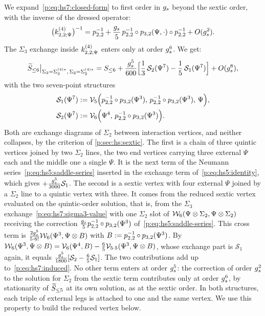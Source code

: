 We expand~\eqref{p:eq:hs7:closed-form} to first order in $\gs$ beyond the sextic order, with the inverse of the dressed operator:
\begin{equation}
\big( \kin{2}{\Psi}{4} \big)^{-1}
  = \sprod{2}{2}^{-1}
    + \frac{\gs}{5} \, \sprod{2}{2}^{-1} \circ \sprod{3}{2}(\Psi, \cdot) \circ \sprod{2}{2}^{-1}
    + O(\gs^2).
\end{equation}
The $\Sigma_3$ exchange inside $\kin{2}{\Psi}{4}$ enters only at order $\gs^6$.
We get:
\begin{equation}
  \label{p:eq:hs7:induced}
  \caction[\le 6] \big|_{\Sigma_3 = \Sigma_3^{(4)*}, \, \Sigma_2 = \Sigma_2^{(4)*}}
    = S_{\le 6}
      + \frac{\gs^5}{600} \Big[ \frac{1}{3} \, \mathcal S_2(\Psi^7) - \frac{1}{5} \, \mathcal S_1(\Psi^7) \Big]
      + O(\gs^6),
\end{equation}
with the two seven-point structures
\begin{subequations}
  \label{p:eq:hs7:structures}
  \begin{align}
    \label{p:eq:hs7:S1}
    \mathcal S_1(\Psi^7)
      &
      := \vertex{5}\Big( \sprod{2}{2}^{-1} \circ \sprod{3}{2}(\Psi^3), \, \sprod{2}{2}^{-1} \circ \sprod{3}{2}(\Psi^3), \, \Psi \Big),
    \\
    \label{p:eq:hs7:S2}
    \mathcal S_2(\Psi^7)
      &
      := \vertex{6}\Big( \Psi^4, \, \sprod{2}{2}^{-1} \circ \sprod{3}{2}(\Psi^3) \Big).
  \end{align}
\end{subequations}
Both are exchange diagrams of $\Sigma_2$ between interaction vertices, and neither collapses, by the criterion of \cref{p:sec:hs:sextic}.
The first is a chain of three quintic vertices joined by two $\Sigma_2$ lines, the two end vertices carrying three external $\Psi$ each and the middle one a single $\Psi$.
It is the next term of the Neumann series~\eqref{p:eq:hs5:saddle-series} inserted in the exchange term of~\eqref{p:eq:hs5:identity}, which gives $+ \tfrac{\gs^5}{3000} \mathcal S_1$.
The second is a sextic vertex with four external $\Psi$ joined by a $\Sigma_2$ line to a quintic vertex with three.
It comes from the reduced sextic vertex evaluated on the quintic-order solution, that is, from the $\Sigma_3$ exchange~\eqref{p:eq:hs7:sigma3-value} with one $\Sigma_2$ slot of $\dvertex{6}(\Psi \otimes \Sigma_2, \Psi \otimes \Sigma_2)$ receiving the correction $\tfrac{\gs}{5} \sprod{2}{2}^{-1} \circ \sprod{3}{2}(\Psi^3)$ of~\eqref{p:eq:hs5:saddle-series}.
This cross term is $\tfrac{2 \gs^5}{5 \cdot 6!} \dvertex{6}(\Psi^3, \Psi \otimes B)$ with $B := \sprod{2}{2}^{-1} \circ \sprod{3}{2}(\Psi^3)$.
By $\dvertex{6}(\Psi^3, \Psi \otimes B) = \vertex{6}(\Psi^4, B) - \tfrac{6}{5} \vertex{5 \cdot 5}(\Psi^3, \Psi \otimes B)$, whose exchange part is $\mathcal S_1$ again, it equals $\tfrac{\gs^5}{1800} [\mathcal S_2 - \tfrac{6}{5} \mathcal S_1]$.
The two contributions add up to~\eqref{p:eq:hs7:induced}.
No other term enters at order $\gs^5$: the correction of order $\gs^2$ to the solution for $\Sigma_2$ from the sextic term contributes only at order $\gs^6$, by stationarity of $\caction[\le 5]$ at its own solution, as at the sextic order.
In both structures, each triple of external legs is attached to one and the same vertex.
  We use this property to build the reduced vertex below.

